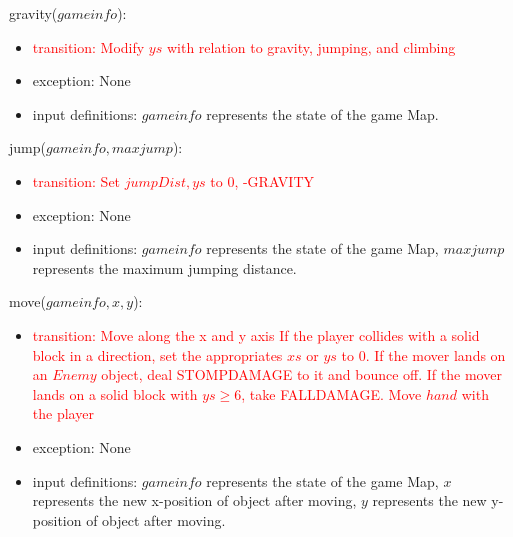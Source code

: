 \documentclass[12pt]{article}
\begin{document}
\noindent gravity($gameinfo$):
\begin{itemize}
    \item \textcolor{red}{transition: Modify $ys$ with relation to gravity, jumping, and climbing}
    \item exception: None
    \item input definitions: $gameinfo$ represents the state of the game Map.
\end{itemize}

\noindent jump($gameinfo, maxjump$):
\begin{itemize}
    \item \textcolor{red}{transition: Set $jumpDist, ys$ to 0, -GRAVITY}
    \item exception: None
    \item input definitions: $gameinfo$ represents the state of the game Map, $maxjump$ represents the maximum jumping distance. 
\end{itemize}

\noindent move($gameinfo, x, y$):
\begin{itemize}
    \item \textcolor{red}{transition: Move along the x and y axis If the player collides with a solid block in a direction, set the appropriates $xs$ or $ys$ to 0. If the mover lands on an $Enemy$ object, deal STOMPDAMAGE to it and bounce off. If the mover lands on a solid block with $ys \geq 6$, take FALLDAMAGE. Move $hand$ with the player}
    \item exception: None
    \item input definitions: $gameinfo$ represents the state of the game Map, $x$ represents the new x-position of object after moving, $y$ represents the new y-position of object after moving. 
\end{itemize}
\end{document}
